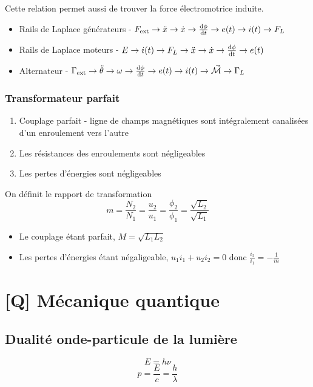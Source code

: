 \documentclass[openany]{book}
\begin{document}
Cette relation permet aussi de trouver la force électromotrice induite. 
\begin{itemize}
    \item Rails de Laplace générateurs - $F_{\text{ext}} \rightarrow \ddot{x} \rightarrow \dot{x} \rightarrow \frac{\text{d} \phi}{\text{d}t} \rightarrow e(t) \rightarrow i(t) \rightarrow F_L$ 
    \item Rails de Laplace moteurs - $E \rightarrow i(t) \rightarrow F_L \rightarrow \ddot{x} \rightarrow \dot{x} \rightarrow \frac{\text{d} \phi}{\text{d}t} \rightarrow e(t)$
    \item Alternateur - $\Gamma_{\text{ext}} \rightarrow \ddot{\theta} \rightarrow \omega \rightarrow \frac{\text{d} \phi}{\text{d}t} \rightarrow e(t) \rightarrow i(t) \rightarrow \vec{\mathcal{M}} \rightarrow \Gamma_L$
\end{itemize}

\subsection{Transformateur parfait}
\begin{enumerate}
    \item Couplage parfait - ligne de champs magnétiques sont intégralement canalisées d'un enroulement vers l'autre
    \item Les résistances des enroulements sont négligeables
    \item Les pertes d'énergies sont négligeables
\end{enumerate}
On définit le rapport de transformation
\[ m = \frac{N_2}{N_1} = \frac{u_2}{u_1} = \frac{\phi_2}{\phi_1} = \frac{\sqrt{L_2}}{\sqrt{L_1}} \]

\begin{itemize}
    \item Le couplage étant parfait, $M = \sqrt{L_1L_2}$
    \item Les pertes d'énergies étant négaligeable, $u_1i_1 + u_2i_2 = 0$ donc $\frac{i_2}{i_1} = -\frac{1}{m}$
\end{itemize}

\clearpage



\clearpage

\chapter{[Q] Mécanique quantique}

\section{Dualité onde-particule de la lumière}
\[ E = h\nu \]
\[ p = \frac{E}{c} = \frac{h}{\lambda} \]
\end{document}
